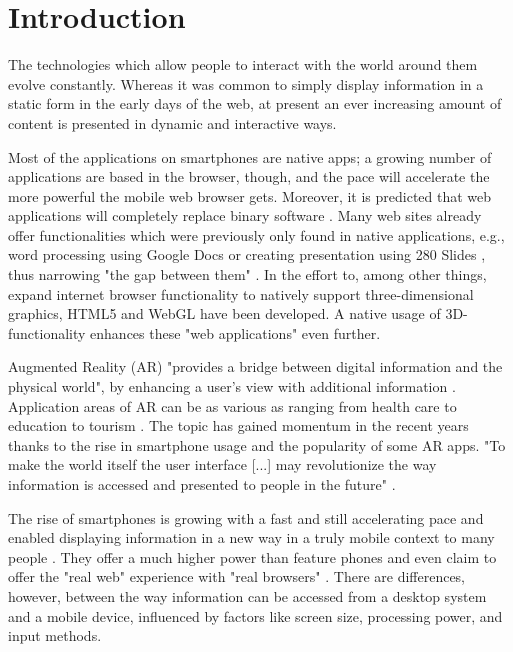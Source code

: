 \documentclass[12pt,journal,compsoc]{IEEEtran}
\begin{document}
\maketitle

\IEEEdisplaynotcompsoctitleabstractindextext
\IEEEpeerreviewmaketitle


\section{Introduction}
The technologies which allow people to interact with the world around them evolve constantly. Whereas it was common to simply display information in a static form in the early days of the web, at present an ever increasing amount of content is presented in dynamic and interactive ways. 

Most of the applications on smartphones are native apps; a growing number of applications are based in the browser, though, and the pace will accelerate the more powerful the mobile web browser gets. Moreover, it is predicted that web applications will completely replace binary software \cite{Taivalsaari2011}. Many web sites already offer functionalities which were previously only found in native applications, e.g., word processing using Google Docs \cite{googledocs} or creating presentation using 280 Slides \cite{280slides}, thus narrowing "the gap between them" \cite{Golubovic2011}. In the effort to, among other things, expand internet browser functionality to natively support three-dimensional graphics, HTML5 and WebGL have been developed. A native usage of 3D-functionality enhances these "web applications" even further.

Augmented Reality (AR) "provides a bridge between digital information and the physical world", by enhancing a user’s view with additional information \cite{Olsson2011b}. Application areas of AR can be as various as ranging from health care \cite{Lui2011} to education \cite{Mannuss2011, Liestol2011} to tourism \cite{Mulloni2011}. The topic has gained momentum in the recent years thanks to the rise in smartphone usage and the popularity of some AR apps. "To make the world itself the user interface [...] may revolutionize the way information is accessed and presented to people in the future" \cite{Hoellerer2004,Wellner1993}.

The rise of smartphones is growing with a fast and still accelerating pace and enabled displaying information in a new way in a truly mobile context to many people \cite{Gartner2010,Nielsen2011}. They offer a much higher power than feature phones and even claim to offer the "real web" experience with "real browsers" \cite{informationweek2007}. There are differences, however, between the way information can be accessed from a desktop system and a mobile device, influenced by factors like screen size, processing power, and input methods.
\end{document}
